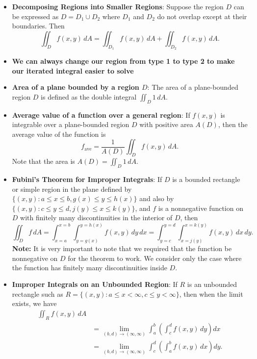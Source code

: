 \documentclass{report}
\begin{document}
\begin{itemize}
\begin{equation}
            \end{equation}
        \item \textbf{Decomposing Regions into Smaller Regions}:
            Suppose the region \(D\) can be expressed as \(D = D_1 \cup D_2\) where \(D_1\) and \(D_2\) do not overlap except at their boundaries. Then
            \[
                \iint_{D} f(x,y) \, dA = \iint_{D_1} f(x,y) \, dA + \iint_{D_2} f(x,y) \, dA.
            \]
        \item \textbf{We can always change our region from type 1 to type 2 to make our iterated integral easier to solve}
        \item \textbf{Area of a plane bounded by a region $D$}:
            The area of a plane-bounded region \(D\) is defined as the double integral \(\iint_{D} 1 \, dA\).
        \item \textbf{Average value of a function over a general region}:
            If \(f(x,y)\) is integrable over a plane-bounded region \(D\) with positive area \(A(D)\), then the average value of the function is
            \[
                f_{\text{ave}} = \frac{1}{A(D)} \iint_{D} f(x,y) \, dA.
            \]
            Note that the area is \(A(D) = \iint_{D} 1 \, dA\).
        \item \textbf{Fubini’s Theorem for Improper Integrals}:
            If $D$ is a bounded rectangle or simple region in the plane defined by $\{(x,y) : a \leq x \leq b, g(x) \leq y \leq h(x)\}$ and also by $\{(x,y) : c \leq y \leq d, j(y) \leq x \leq k(y)\}$, and $f$ is a nonnegative function on $D$ with finitely many discontinuities in the interior of $D$, then
            \[
                \iint_D f \, dA = \int_{x=a}^{x=b} \int_{y=g(x)}^{y=h(x)} f(x,y) \, dy \, dx = \int_{y=c}^{y=d} \int_{x=j(y)}^{x=k(y)} f(x,y) \, dx \, dy.
            \]
            \bigbreak \noindent 
            \textbf{Note:} It is very important to note that we required that the function be nonnegative on  $D$ for the theorem to work. We consider only the case where the function has finitely many discontinuities inside $D$.
        \item \textbf{Improper Integrals on an Unbounded Region}:
            If $R$ is an unbounded rectangle such as $R = \{(x,y) : a \leq x < \infty, c \leq y < \infty\}$, then when the limit exists, we have
            \begin{align*}
                \iint_R f(x,y) \, dA  &\\
                &= \lim_{(b,d) \to (\infty, \infty)} \int_a^b \left( \int_c^d f(x,y) \, dy \right) dx  \\
                &= \lim_{(b,d) \to (\infty, \infty)} \int_c^d \left( \int_a^b f(x,y) \, dx \right) dy
            .\end{align*}


\end{itemize}
\end{document}
